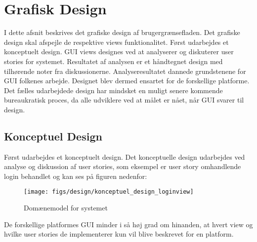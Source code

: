 \chapter{Grafisk Design}
I dette afsnit beskrives det grafiske design af brugergrænsefladen. Det grafiske design skal afspejle de respektive views funktionalitet. Først udarbejdes et konceptuelt design. GUI views designes ved at analyserer og diskuterer user stories for systemet. Resultatet af analysen er et håndtegnet design med tilhørende noter fra diskussionerne. Analyseresultatet dannede grundstenene for GUI folkenes arbejde. Designet blev dermed ensartet for de forskellige platforme. Det fælles udarbejdede design har mindsket en muligt senere kommende bureaukratisk proces, da alle udviklere ved at målet er nået, når GUI svarer til design. 

\section{Konceptuel Design}
Først udarbejdes et konceptuelt design. Det konceptuelle design udarbejdes ved analyse og diskussion af user stories, som eksempel er user story omhandlende login behandlet og kan ses på figuren nedenfor:

\begin{figure}
	\centering
	\texttt{[image: figs/design/konceptuel\_design\_loginview]}
	\caption{Domænemodel for systemet}
	\label{fig:domainmodel}
\end{figure}

De forskellige platformes GUI minder i så høj grad om hinanden, at hvert view og hvilke user stories de implementerer kun vil blive beskrevet for en platform. 